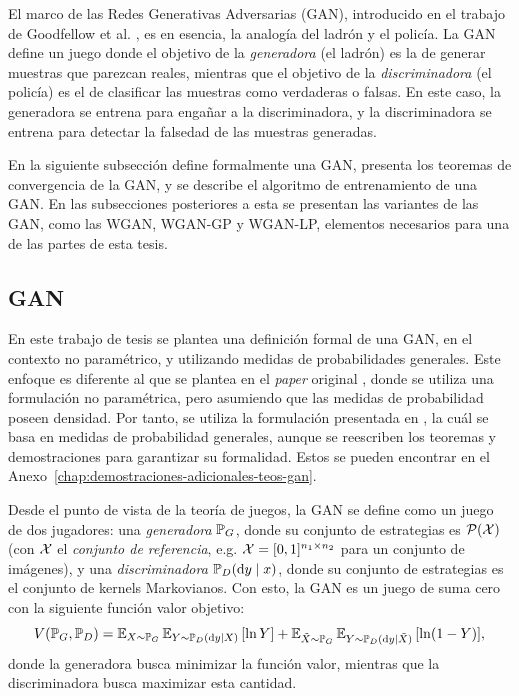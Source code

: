 El marco de las Redes Generativas Adversarias (GAN), introducido en el trabajo de Goodfellow et al. \cite{goodfellow2014generative}, es en esencia, la analogía del ladrón y el policía.
La GAN define un juego donde el objetivo de la \emph{generadora} (el ladrón) es la de generar muestras que parezcan reales, mientras que el objetivo de la \emph{discriminadora} (el policía) es el de clasificar las muestras como verdaderas o falsas.
En este caso, la generadora se entrena para engañar a la discriminadora, y la discriminadora se entrena para detectar la falsedad de las muestras generadas.

En la siguiente subsección define formalmente una GAN, presenta los teoremas de convergencia de la GAN, y se describe el algoritmo de entrenamiento de una GAN. En las subsecciones posteriores a esta se presentan las variantes de las GAN, como las WGAN, WGAN-GP y WGAN-LP, elementos necesarios para una de las partes de esta tesis.

\subsection{GAN}\label{ssec:GAN}

En este trabajo de tesis se plantea una definición formal de una GAN, en el contexto no paramétrico, y utilizando medidas de probabilidades generales. Este enfoque es diferente al que se plantea en el \textit{paper} original \cite{goodfellow2014generative}, donde se utiliza una formulación no paramétrica, pero asumiendo que las medidas de probabilidad poseen densidad. Por tanto, se utiliza la formulación presentada en \cite{wikipediagan}, la cuál se basa en medidas de probabilidad generales, aunque se reescriben los teoremas y demostraciones para garantizar su formalidad. Estos se pueden encontrar en el Anexo~\ref{chap:demostraciones-adicionales-teos-gan}.

Desde el punto de vista de la teoría de juegos, la GAN se define como un juego de dos jugadores: una \textit{generadora} $\Prob_G$, donde su conjunto de estrategias es $\ProbSpace[\cX]$ (con $\cX$ el \textit{conjunto de referencia}, e.g. $\cX=[0, 1]^{n_1\times n_2}$ para un conjunto de imágenes), y una \textit{discriminadora} $\Prob_D(\dd y \mid x)$, donde su conjunto de estrategias es el conjunto de kernels Markovianos. Con esto, la GAN es un juego de suma cero con la siguiente función valor objetivo:
\begin{equation}
	\label{eq:gan-objective}
	V(\Prob_G, \Prob_D)
	= \Exp_{X\sim\Prob_G}{\Exp_{Y \sim \Prob_D(\dd y \mid X)} \left[ \ln Y \right]}
	+ \Exp_{\tilde X\sim\Prob_G}{\Exp_{Y \sim \Prob_D(\dd y \mid \tilde X)} \left[ \ln (1 - Y) \right]},
\end{equation}
donde la generadora busca minimizar la función valor, mientras que la discriminadora busca maximizar esta cantidad.

